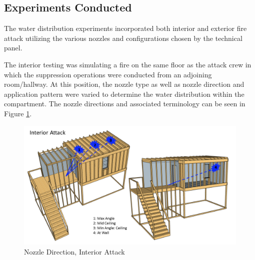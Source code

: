 \documentclass{article}
\begin{document}
\clearpage

\subsection{Experiments Conducted}

The water distribution experiments incorporated both interior and exterior fire attack utilizing the various nozzles and configurations chosen by the technical panel. 

The interior testing was simulating a fire on the same floor as the attack crew in which the suppression operations were conducted from an adjoining room/hallway. At this position, the nozzle type as well as nozzle direction and application pattern were varied to determine the water distribution within the compartment. The nozzle directions and associated terminology can be seen in Figure \ref{fig:Nozzle_Direction_Interior_Attack}.

\begin{figure}[!ht]
	\centering
	\includegraphics[width=6in]{Figures/Water_Distribution/Nozzle_Position_Int.png}
	\caption{Nozzle Direction, Interior Attack}
	\label{fig:Nozzle_Direction_Interior_Attack}
\end{figure}

\clearpage
\end{document}
